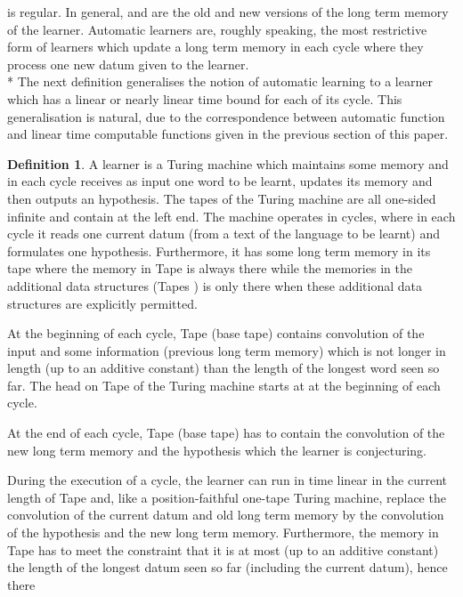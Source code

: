\documentclass{LMCS}
\theoremstyle{plain}\newtheorem{athm}[thm]{Theorem}
\theoremstyle{plain}\newtheorem{aprop}[thm]{Proposition}
\theoremstyle{plain}\newtheorem{aprob}[thm]{Open Problem}
\theoremstyle{plain}\newtheorem{acor}[thm]{Corollary}
\theoremstyle{plain}\newtheorem{alem}[thm]{Lemma}
\theoremstyle{definition}\newtheorem{adefn}[thm]{Definition}
\theoremstyle{definition}\newtheorem{arem}[thm]{Remark}
\theoremstyle{plain}\newtheorem{aexmp}[thm]{Example}
\theoremstyle{plain}\newtheorem{aclm}[thm]{Claim}
\def\sp{\\*\indent}
\begin{document}
is regular. In general,  and  are the old and new versions
of the long term memory of the learner. Automatic learners are, roughly
speaking, the most restrictive form of learners which update a long term
memory in each cycle where they process one new datum given to the learner.
\sp
The next definition generalises the notion of automatic learning to
a learner which has a linear or nearly linear time bound for each of
its cycle. This generalisation is natural, due to the correspondence
between automatic function and linear time computable functions given
in the previous section of this paper.

\begin{adefn}
A learner  is a Turing machine which maintains some memory and in each
cycle receives as input one word to be learnt, updates its memory
and then outputs an hypothesis.
The tapes of the Turing machine are all one-sided
infinite and contain 
at the left end. The machine operates in cycles, where in each cycle
it reads one current datum (from a text of the language to be learnt)
and formulates one hypothesis. Furthermore, it has some long term memory
in its tape where the memory in Tape  is always there while the
memories in the additional data structures (Tapes )
is only there when these additional data structures are explicitly
permitted.
\begin{iteMize}{}
\item At the beginning of each cycle,
      Tape  (base tape) contains convolution of the input
      and some information (previous long term memory) which is not 
      longer in length (up to an additive
      constant) than the length of the longest word seen so far.
      The head on Tape  of the Turing machine starts at  at
      the beginning of each cycle.
\item At the end of each cycle,
      Tape  (base tape) has to contain the convolution of
      the new long term memory and the hypothesis which the
      learner is conjecturing.
\item During the execution of a cycle, the learner
      can run in time linear in the current length of Tape 
      and, like a position-faithful one-tape Turing machine,
      replace the convolution of the current datum and old long term
      memory by the convolution of the hypothesis and the new long term
      memory. Furthermore, the memory in Tape  
      has to meet the constraint that
      it is at most (up to an additive constant) the length of the longest 
      datum seen so far (including the current datum), hence there

\end{iteMize}
\end{adefn}
\end{document}
